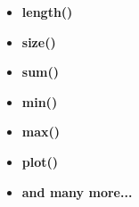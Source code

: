 \documentclass[11pt]{article}
\begin{document}
\begin{itemize}
		
		\begin{itemize}
			\item \textbf{ \Large \color{black} length()} \\  \vspace{15mm}
            		\item \textbf{ \Large \color{black} size()} \\  \vspace{15mm}
            		\item \textbf{ \Large \color{black} sum()} \\  \vspace{15mm}
            		\item \textbf{ \Large \color{black} min()} \\  \vspace{15mm}	
            		\item \textbf{ \Large \color{black} max()} \\  \vspace{15mm}
            		\item \textbf{ \Large \color{black} plot()} \\  \vspace{15mm}		
            		\item \textbf{ \Large \color{black} and many more...} \\  \vspace{15mm}	
		\end{itemize}


\end{itemize}


	
\end{document}
